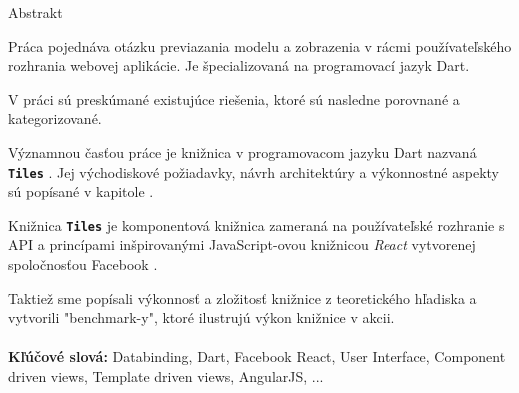 \documentclass[oneside, 12pt]{book}
\def\mfkeywordssk{Databinding, Dart, Facebook React, User Interface, Component driven views, Template driven views, AngularJS, ... }
\newcommand{\tiles}[0]{\textbf{\texttt{Tiles}} }
\newcommand{\react}[0]{\textit{React} }
\newcommand{\facebook}[0]{Facebook }
\begin{document}
\noindent
\begin{center}
\begin{minipage}{1\textwidth}
\centerline{\large Abstrakt}
\setlength{\parskip}{0.2cm}
Práca pojednáva otázku previazania modelu a zobrazenia v rácmi používateľského rozhrania webovej aplikácie.
Je špecializovaná na programovací jazyk Dart.

V práci sú preskúmané existujúce riešenia, ktoré sú nasledne porovnané a kategorizované.

Významnou časťou práce je knižnica v programovacom jazyku Dart nazvaná \tiles.
Jej východiskové požiadavky, návrh architektúry a výkonnostné aspekty sú popísané v kapitole .

Knižnica \tiles je komponentová knižnica zameraná na používateľské rozhranie
s API a princípami inšpirovanými JavaScript-ovou knižnicou \react vytvorenej spoločnosťou \facebook.

Taktiež sme popísali výkonnosť a zložitosť knižnice z teoretického hľadiska 
a vytvorili "benchmark-y", ktoré ilustrujú výkon knižnice v akcii.
\\ \\ 
{\bf Kľúčové slová:} \mfkeywordssk
\end{minipage}
\end{center}
\eject %



%

\tableofcontents

\listoffigures
\end{document}
